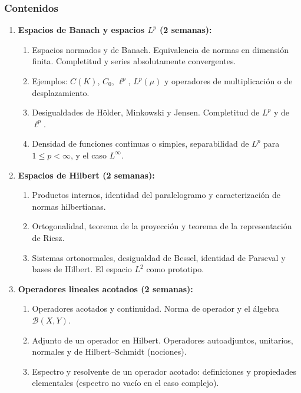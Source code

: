 \begin{refsection}
\subsubsection*{Contenidos}

\begin{enumerate}
\item \textbf{Espacios de Banach y espacios $L^p$ (2 semanas):}
\begin{enumerate}
    \item Espacios normados y de Banach. Equivalencia de normas en dimensión finita. Completitud y series absolutamente convergentes.
    \item Ejemplos: $C(K)$, $C_0$, $\ell^p$, $L^p(\mu)$ y operadores de multiplicación o de desplazamiento.
    \item Desigualdades de Hölder, Minkowski y Jensen. Completitud de $L^p$ y de $\ell^p$.
    \item Densidad de funciones continuas o simples, separabilidad de $L^p$ para $1\le p<\infty$, y el caso $L^\infty$.
\end{enumerate}

\item \textbf{Espacios de Hilbert (2 semanas):}
\begin{enumerate}
    \item Productos internos, identidad del paralelogramo y caracterización de normas hilbertianas.
    \item Ortogonalidad, teorema de la proyección y teorema de la representación de Riesz.
    \item Sistemas ortonormales, desigualdad de Bessel, identidad de Parseval y bases de Hilbert. El espacio $L^2$ como prototipo.
\end{enumerate}

\item \textbf{Operadores lineales acotados (2 semanas):}
\begin{enumerate}
    \item Operadores acotados y continuidad. Norma de operador y el álgebra $\mathcal{B}(X,Y)$.
    \item Adjunto de un operador en Hilbert. Operadores autoadjuntos, unitarios, normales y de Hilbert--Schmidt (nociones).
    \item Espectro y resolvente de un operador acotado: definiciones y propiedades elementales (espectro no vacío en el caso complejo).
\end{enumerate}


\end{enumerate}
\end{refsection}
